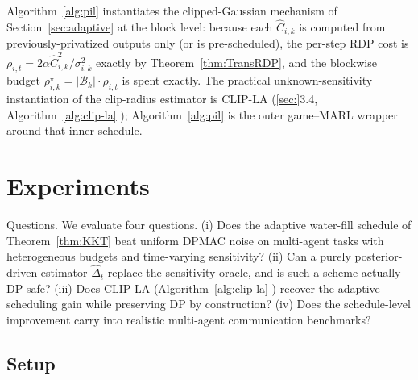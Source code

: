 \documentclass{article}
\begin{document}
Algorithm~\ref{alg:pil} instantiates the clipped-Gaussian mechanism of Section~\ref{sec:adaptive} at the block level: because each $\hat C_{i,k}$ is computed from previously-privatized outputs only (or is pre-scheduled), the per-step RDP cost is $\rho_{i,t} = 2\alpha \hat C_{i,k}^2/\sigma_{i,k}^2$ exactly by Theorem~\ref{thm:TransRDP}, and the blockwise budget $\rho_{i,k}^\star = |\mathcal{B}_k|\cdot \rho_{i,t}$ is spent exactly. The practical unknown-sensitivity instantiation of the clip-radius estimator is CLIP-LA (\ref{sec:}3.4, Algorithm~\ref{alg:clip-la} ); Algorithm~\ref{alg:pil}  is the outer game–MARL wrapper around that inner schedule.



\section{Experiments}
\label{sec:exp}
Questions. We evaluate four questions. (i) Does the adaptive water-fill schedule of Theorem~\ref{thm:KKT} beat uniform DPMAC noise on multi-agent tasks with heterogeneous budgets and time-varying sensitivity? (ii) Can a purely posterior-driven estimator $\hat\Delta_t$ replace the sensitivity oracle, and is such a scheme actually DP-safe? (iii) Does CLIP-LA (Algorithm~\ref{alg:clip-la} ) recover the adaptive-scheduling gain while preserving DP by construction? (iv) Does the schedule-level improvement carry into realistic multi-agent communication benchmarks?

\subsection{Setup}
\label{sec:setup}
\end{document}
